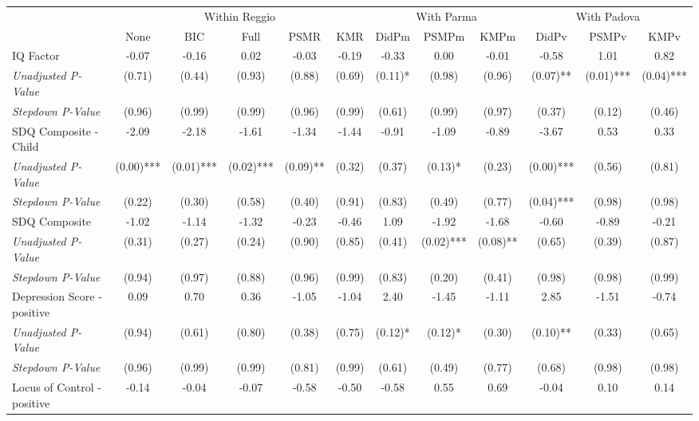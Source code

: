 \begin{tabular}{l c c c c c c c c c c c}
\toprule
& \multicolumn{5}{c}{Within Reggio} & \multicolumn{3}{c}{With Parma} & \multicolumn{3}{c}{With Padova} \\\cmidrule(lr){2-6} \cmidrule(lr){7-9} \cmidrule(lr){10-12}
 & None & BIC & Full & PSMR & KMR & DidPm & PSMPm & KMPm & DidPv & PSMPv & KMPv \\
\midrule
IQ Factor & -0.07 & -0.16 & 0.02 & -0.03 & -0.19 & -0.33 & 0.00 & -0.01 & -0.58 & 1.01 & 0.82 \\
\quad \textit{Unadjusted P-Value} & (0.71) & (0.44) & (0.93) & (0.88) & (0.69) & (0.11)* & (0.98) & (0.96) & (0.07)** & (0.01)*** & (0.04)*** \\
\quad \textit{Stepdown P-Value} & (0.96) & (0.99) & (0.99) & (0.96) & (0.99) & (0.61) & (0.99) & (0.97) & (0.37) & (0.12) & (0.46) \\
SDQ Composite - Child & -2.09 & -2.18 & -1.61 & -1.34 & -1.44 & -0.91 & -1.09 & -0.89 & -3.67 & 0.53 & 0.33 \\
\quad \textit{Unadjusted P-Value} & (0.00)*** & (0.01)*** & (0.02)*** & (0.09)** & (0.32) & (0.37) & (0.13)* & (0.23) & (0.00)*** & (0.56) & (0.81) \\
\quad \textit{Stepdown P-Value} & (0.22) & (0.30) & (0.58) & (0.40) & (0.91) & (0.83) & (0.49) & (0.77) & (0.04)*** & (0.98) & (0.98) \\
SDQ Composite & -1.02 & -1.14 & -1.32 & -0.23 & -0.46 & 1.09 & -1.92 & -1.68 & -0.60 & -0.89 & -0.21 \\
\quad \textit{Unadjusted P-Value} & (0.31) & (0.27) & (0.24) & (0.90) & (0.85) & (0.41) & (0.02)*** & (0.08)** & (0.65) & (0.39) & (0.87) \\
\quad \textit{Stepdown P-Value} & (0.94) & (0.97) & (0.88) & (0.96) & (0.99) & (0.83) & (0.20) & (0.41) & (0.98) & (0.98) & (0.99) \\
Depression Score - positive & 0.09 & 0.70 & 0.36 & -1.05 & -1.04 & 2.40 & -1.45 & -1.11 & 2.85 & -1.51 & -0.74 \\
\quad \textit{Unadjusted P-Value} & (0.94) & (0.61) & (0.80) & (0.38) & (0.75) & (0.12)* & (0.12)* & (0.30) & (0.10)** & (0.33) & (0.65) \\
\quad \textit{Stepdown P-Value} & (0.96) & (0.99) & (0.99) & (0.81) & (0.99) & (0.61) & (0.49) & (0.77) & (0.68) & (0.98) & (0.98) \\
Locus of Control - positive & -0.14 & -0.04 & -0.07 & -0.58 & -0.50 & -0.58 & 0.55 & 0.69 & -0.04 & 0.10 & 0.14 \\

\end{tabular}
